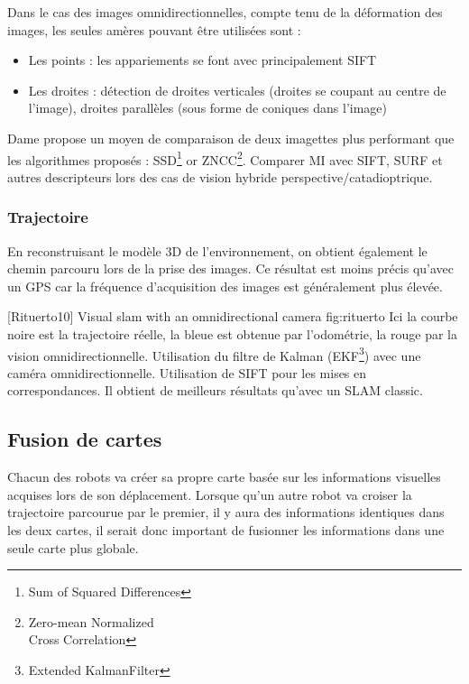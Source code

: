 
Dans le cas des images omnidirectionnelles, compte tenu de la déformation des images, les seules amères pouvant être utilisées sont :
\begin{itemize}
\item Les points : les appariements se font avec principalement SIFT
\item Les droites : détection de droites verticales (droites se coupant au centre de l'image), droites parallèles (sous forme de coniques dans l'image)
\end{itemize}



Dame propose un moyen de comparaison de deux imagettes plus performant que les algorithmes proposés : SSD\footnote{Sum of Squared Differences} or ZNCC\footnote{Zero-mean Normalized\\Cross Correlation}.
Comparer MI avec SIFT, SURF et autres descripteurs lors des cas de vision hybride perspective/catadioptrique.  

\subsubsection{Trajectoire}

En reconstruisant le modèle 3D de l’environnement, on obtient également le chemin parcouru lors de la prise des images.
Ce résultat est moins précis qu'avec un GPS car la fréquence d'acquisition des images est généralement plus élevée.

 {[Rituerto10] Visual slam with an omnidirectional camera} {fig:rituerto}
Ici la courbe noire est la trajectoire réelle, la bleue est obtenue par l'odométrie, la rouge par la vision omnidirectionnelle. Utilisation du filtre de Kalman (EKF\footnote{Extended KalmanFilter}) avec une caméra omnidirectionnelle. Utilisation de SIFT pour les mises en correspondances. Il obtient de meilleurs résultats qu'avec un SLAM classic. 


\subsection{Fusion de cartes}

Chacun des robots va créer sa propre carte basée sur les informations visuelles acquises lors de son déplacement.
Lorsque qu'un autre robot va croiser la trajectoire parcourue par le premier, il y aura des informations identiques dans les deux cartes, il serait donc important de fusionner les informations dans une seule carte plus globale.

